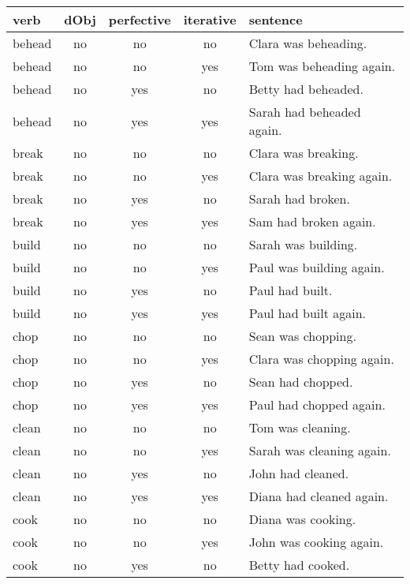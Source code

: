 \begin{longtable}{l|ccc|p{5cm}}
\textbf{verb}     & \textbf{dObj} & \textbf{perfective} & \textbf{iterative}    & \textbf{sentence} \\       
\hline
\endhead
behead    & no   & no   & no   & Clara was beheading.        \\
behead    & no   & no   & yes  & Tom was beheading again.    \\
behead    & no   & yes  & no   & Betty had beheaded.         \\
behead    & no   & yes  & yes  & Sarah had beheaded again.   \\
break     & no   & no   & no   & Clara was breaking.         \\
break     & no   & no   & yes  & Clara was breaking again.   \\
break     & no   & yes  & no   & Sarah had broken.           \\
break     & no   & yes  & yes  & Sam had broken again.       \\
build     & no   & no   & no   & Sarah was building.         \\
build     & no   & no   & yes  & Paul was building again.    \\
build     & no   & yes  & no   & Paul had built.             \\
build     & no   & yes  & yes  & Paul had built again.       \\
chop      & no   & no   & no   & Sean was chopping.          \\
chop      & no   & no   & yes  & Clara was chopping again.   \\
chop      & no   & yes  & no   & Sean had chopped.           \\
chop      & no   & yes  & yes  & Paul had chopped again.     \\
clean     & no   & no   & no   & Tom was cleaning.           \\
clean     & no   & no   & yes  & Sarah was cleaning again.   \\
clean     & no   & yes  & no   & John had cleaned.           \\
clean     & no   & yes  & yes  & Diana had cleaned again.    \\
cook      & no   & no   & no   & Diana was cooking.          \\
cook      & no   & no   & yes  & John was cooking again.     \\
cook      & no   & yes  & no   & Betty had cooked.           \\

\end{longtable}
